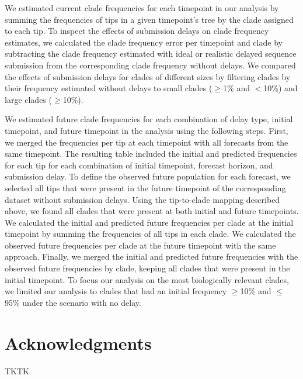 \documentclass[9pt,lineno]{elife}
\begin{document}
We estimated current clade frequencies for each timepoint in our analysis by summing the frequencies of tips in a given timepoint's tree by the clade assigned to each tip.
To inspect the effects of submission delays on clade frequency estimates, we calculated the clade frequency error per timepoint and clade by subtracting the clade frequency estimated with ideal or realistic delayed sequence submission from the corresponding clade frequency without delays.
We compared the effects of submission delays for clades of different sizes by filtering clades by their frequency estimated without delays to small clades ($\ge$1\% and $<$10\%) and large clades ($\ge$10\%).

We estimated future clade frequencies for each combination of delay type, initial timepoint, and future timepoint in the analysis using the following steps.
First, we merged the frequencies per tip at each timepoint with all forecasts from the same timepoint.
The resulting table included the initial and predicted frequencies for each tip for each combination of initial timepoint, forecast horizon, and submission delay.
To define the observed future population for each forecast, we selected all tips that were present in the future timepoint of the corresponding dataset without submission delays.
Using the tip-to-clade mapping described above, we found all clades that were present at both initial and future timepoints.
We calculated the initial and predicted future frequencies per clade at the initial timepoint by summing the frequencies of all tips in each clade.
We calculated the observed future frequencies per clade at the future timepoint with the same approach.
Finally, we merged the initial and predicted future frequencies with the observed future frequencies by clade, keeping all clades that were present in the initial timepoint.
To focus our analysis on the most biologically relevant clades, we limited our analysis to clades that had an initial frequency $\ge$10\% and $\le$95\% under the scenario with no delay.

\section{Acknowledgments}

TKTK

\nocite{*} %

\end{document}
